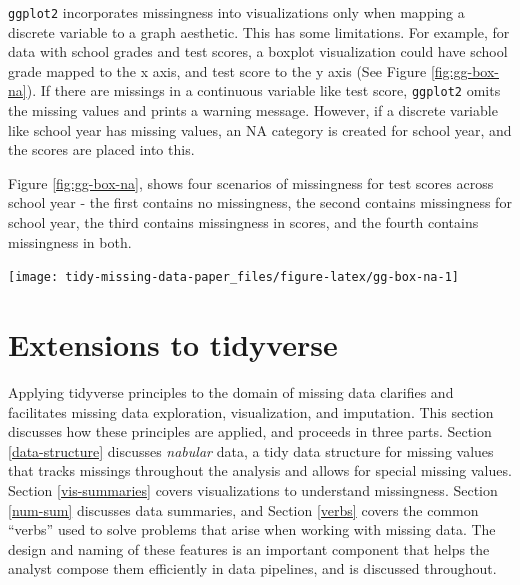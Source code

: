 \documentclass[]{article}
\let\origfigure\figure
\let\endorigfigure\endfigure
\renewenvironment{figure}[1][2] {
    \expandafter\origfigure\expandafter[H]
} {
    \endorigfigure
}
\theoremstyle{definition}
\theoremstyle{definition}
\theoremstyle{definition}
\theoremstyle{remark}
\begin{document}
\texttt{ggplot2} incorporates missingness into visualizations only when
mapping a discrete variable to a graph aesthetic. This has some
limitations. For example, for data with school grades and test scores, a
boxplot visualization could have school grade mapped to the x axis, and
test score to the y axis (See Figure \ref{fig:gg-box-na}). If there are
missings in a continuous variable like test score, \texttt{ggplot2}
omits the missing values and prints a warning message. However, if a
discrete variable like school year has missing values, an NA category is
created for school year, and the scores are placed into this.

Figure \ref{fig:gg-box-na}, shows four scenarios of missingness for test
scores across school year - the first contains no missingness, the
second contains missingness for school year, the third contains
missingness in scores, and the fourth contains missingness in both.

\begin{figure}

{\centering \texttt{[image: tidy-missing-data-paper\_files/figure-latex/gg-box-na-1]} 

}

\caption{ggplot2 provides different visualizations depending on what type of data has missing values. (A) Data is complete and graphic is presented; (B) Missings are only in category variable year - an additional 'NA' boxplot is created; (C) Missings only in scores, no additional missingness information is shown; (D) Missings in both scores and school year, additional missing information is shown. The missingness category is only shown when there are missings in categorical variables such as year (plots (B) and (D)). In (C), no missingness information is given on the graphic, despite there being missings in score, and a warning message is displayed about the number of missing values omitted.}\label{fig:gg-box-na}
\end{figure}

\hypertarget{extensions}{%
\section{Extensions to tidyverse}\label{extensions}}

Applying tidyverse principles to the domain of missing data clarifies
and facilitates missing data exploration, visualization, and imputation.
This section discusses how these principles are applied, and proceeds in
three parts. Section \ref{data-structure} discusses \emph{nabular} data,
a tidy data structure for missing values that tracks missings throughout
the analysis and allows for special missing values. Section
\ref{vis-summaries} covers visualizations to understand missingness.
Section \ref{num-sum} discusses data summaries, and Section \ref{verbs}
covers the common ``verbs'' used to solve problems that arise when
working with missing data. The design and naming of these features is an
important component that helps the analyst compose them efficiently in
data pipelines, and is discussed throughout.
\end{document}
